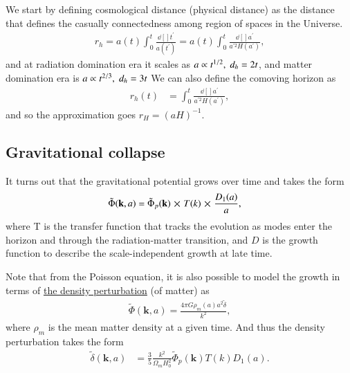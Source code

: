 \documentclass[a4paper, 12pt]{article}
\begin{document}
{{  We start by defining cosmological distance (physical distance) as the distance that defines the
  casually connectedness among region of spaces in the Universe. 
  \begin{align}
    \label{cosmological distance}
    r_{h} = a(t) \int_{0}^{t}
    \frac{\dd[]{t^{\prime}}}{a(t^{\prime})} = a(t) \int_{0}^{t}
    \frac{\dd[]{a^{\prime}}}{a^{\prime 2} H(a^{\prime}) },
  \end{align} and at radiation domination era it scales as \( a \propto
  t^{1/2},\hspace{0.1cm} d_{h} = 2t  \), and matter domination era is \( a \propto
  t^{2/3},\hspace{0.1cm} d_{h} = 3t   \) 
  We can also define the comoving horizon as 
  \begin{align}
    \label{comoving horizon}
    r_{h}(t) &= \int_{0}^{t} \frac{\dd[]{a^{\prime}}}{a^{\prime
    2}H(a^{\prime}) }, 
  \end{align} and so the approximation goes \( r_H = (aH)^{-1}  \).

  \subsection{Gravitational collapse}%
    \label{sub:Gravitational collapse}
    It turns out that the gravitational potential grows over time and
    takes the form 
    \begin{align}
      \label{potential growth}
      \tilde{\Phi}(\textbf{k}, a) &= \tilde{\Phi}_{p}(\textbf{k})
      \cross T(k) \cross \frac{D_1(a)}{a},
    \end{align} where T is the transfer function that tracks the evolution
    as modes enter the horizon and through the radiation-matter
    transition, and \( D \) is the growth function to describe the
    scale-independent growth at late time.
    
    Note that from the Poisson equation, it is also possible to model the
    growth in terms of \underline{the density perturbation} (of matter)
    as 
    \begin{align}
      \label{poisson equation}
      \tilde{\Phi}(\textbf{k}, a) = \frac{4\pi G \rho_{m}(a) a^{2}
      \tilde{\delta} }{k^2}, 
    \end{align} where \( \rho_{m} \) is the mean matter density at a
    given time. And thus the density perturbation takes the form 
    \begin{align}
      \label{density perturbation inhomo}
      \tilde{\delta}(\textbf{k}, a ) &= \frac{3}{5}
      \frac{k^2}{\Omega_{m} H_{0}^{2}} \tilde{\Phi}_p
      (\textbf{k}) T(k) D_1(a).
    \end{align}
}}
\end{document}
